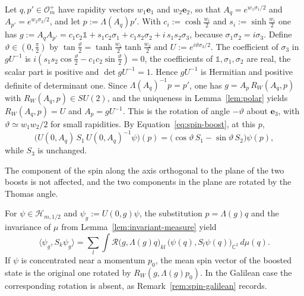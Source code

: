 \begin{example}\label{ex:spin-thomas}
	Let $q,p'\in\mathcal{O}_m^+$ have rapidity vectors $w_1\mathbf{e}_1$ and $w_2\mathbf{e}_2$, so that $A_q=e^{w_1\sigma_1/2}$ and $A_{p'}=e^{w_2\sigma_2/2}$, and let $p:=\Lambda(A_q)p'$. With $c_i:=\cosh\frac{w_i}2$ and $s_i:=\sinh\frac{w_i}2$ one has $g:=A_qA_{p'}=c_1c_2\mathbb{1}+s_1c_2\sigma_1+c_1s_2\sigma_2+i\,s_1s_2\sigma_3$, because $\sigma_1\sigma_2=i\sigma_3$. Define $\vartheta\in(0,\frac\pi2)$ by $\tan\frac\vartheta2=\tanh\frac{w_1}2\tanh\frac{w_2}2$ and $U:=e^{i\vartheta\sigma_3/2}$. The coefficient of $\sigma_3$ in $gU^{-1}$ is $i(s_1s_2\cos\frac\vartheta2-c_1c_2\sin\frac\vartheta2)=0$, the coefficients of $\mathbb{1},\sigma_1,\sigma_2$ are real, the scalar part is positive and $\det gU^{-1}=1$. Hence $gU^{-1}$ is Hermitian and positive definite of determinant one. Since $\Lambda(A_q)^{-1}p=p'$, one has $g=A_p\,R_W(A_q,p)$ with $R_W(A_q,p)\in SU(2)$, and the uniqueness in Lemma~\ref{lem:polar} yields $R_W(A_q,p)=U$ and $A_p=gU^{-1}$. This is the rotation of angle $-\vartheta$ about $\mathbf{e}_3$, with $\vartheta\simeq w_1w_2/2$ for small rapidities. By Equation~\eqref{eq:spin-boost}, at this $p$,
	\begin{equation*}
		\big(U(0,A_q)\,S_1\,U(0,A_q)^{-1}\psi\big)(p)=\big(\cos\vartheta\,S_1-\sin\vartheta\,S_2\big)\psi(p),
	\end{equation*}
	while $S_3$ is unchanged.
\end{example}

\noindent The component of the spin along the axis orthogonal to the plane of the two boosts is not affected, and the two components in the plane are rotated by the Thomas angle.

\begin{remark}\label{rem:mean-spin}
	For $\psi\in\mathcal{H}_{m,1/2}$ and $\psi_g:=U(0,g)\psi$, the substitution $p=\Lambda(g)q$ and the invariance of $\mu$ from Lemma~\ref{lem:invariant-measure} yield
	\begin{equation*}
		\langle\psi_g,S_k\psi_g\rangle=\sum_l\int\mathcal{R}\big(g,\Lambda(g)q\big)_{kl}\,\big(\psi(q),S_l\psi(q)\big)_{\mathbb{C}^2}\,d\mu(q).
	\end{equation*}
	If $\psi$ is concentrated near a momentum $p_0$, the mean spin vector of the boosted state is the original one rotated by $R_W(g,\Lambda(g)p_0)$. In the Galilean case the corresponding rotation is absent, as Remark~\ref{rem:spin-galilean} records.
\end{remark}

